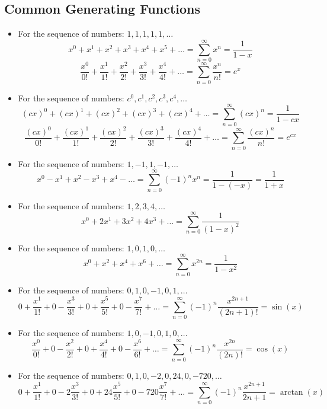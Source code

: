 \documentclass[letterpaper]{article}
\begin{document}
\subsection{Common Generating Functions}
\begin{itemize}
    \item For the sequence of numbers: $1, 1, 1, 1, 1, \dots$
    \[x^0 + x^1 + x^2 + x^3 + x^4 + x^5 + \dots = \sum_{n = 0}^{\infty} x^n = \frac{1}{1 - x}\]
    \[\frac{x^0}{0!} + \frac{x^1}{1!} + \frac{x^2}{2!} + \frac{x^3}{3!} + \frac{x^4}{4!} + \dots = \sum_{n = 0}^{\infty} \frac{x^n}{n!} = e^x\]

    \item For the sequence of numbers: $c^0, c^1, c^2, c^3, c^4, \dots$
    \[(cx)^0 + (cx)^1 + (cx)^2 + (cx)^3 + (cx)^4 + \dots = \sum_{n = 0}^{\infty} (cx)^n = \frac{1}{1 - cx}\]
    \[\frac{(cx)^0}{0!} + \frac{(cx)^1}{1!} + \frac{(cx)^2}{2!} + \frac{(cx)^3}{3!} + \frac{(cx)^4}{4!} + \dots = \sum_{n = 0}^{\infty} \frac{(cx)^n}{n!} = e^{cx}\]

    \item For the sequence of numbers: $1, -1, 1, -1, \dots$
    \[x^0 - x^1 + x^2 - x^3 + x^4 - \dots = \sum_{n = 0}^{\infty} (-1)^n x^n = \frac{1}{1 - (-x)} = \frac{1}{1 + x}\]

    \item For the sequence of numbers: $1, 2, 3, 4, \dots$
    \[x^0 + 2x^1 + 3x^2 + 4x^3 + \dots = \sum_{n = 0}^{\infty} \frac{1}{(1 - x)^2}\]

    \item For the sequence of numbers: $1, 0, 1, 0, \dots$
    \[x^0 + x^2 + x^4 + x^6 + \dots = \sum_{n = 0}^{\infty} x^{2n} = \frac{1}{1 - x^2}\]

    \item For the sequence of numbers: $0, 1, 0, -1, 0, 1, \dots$
    \[0 + \frac{x^1}{1!} + 0 - \frac{x^3}{3!} + 0 + \frac{x^5}{5!} + 0 - \frac{x^7}{7!} + \dots = \sum_{n = 0}^{\infty} (-1)^n \frac{x^{2n + 1}}{(2n + 1)!} = \sin(x)\]

    \item For the sequence of numbers: $1, 0, -1, 0, 1, 0, \dots$
    \[\frac{x^0}{0!} + 0 - \frac{x^2}{2!} + 0 + \frac{x^4}{4!} + 0 - \frac{x^6}{6!} + \dots = \sum_{n = 0}^{\infty} (-1)^n \frac{x^{2n}}{(2n)!} = \cos(x)\]

    \item For the sequence of numbers: $0, 1, 0, -2, 0, 24, 0, -720, \dots$
    \[0 + \frac{x^1}{1!} + 0 - 2 \frac{x^3}{3!} + 0 + 24\frac{x^5}{5!} + 0 - 720 \frac{x^7}{7!} + \dots = \sum_{n = 0}^{\infty} (-1)^n \frac{x^{2n + 1}}{2n + 1} = \arctan(x)\]


\end{itemize}
\end{document}
